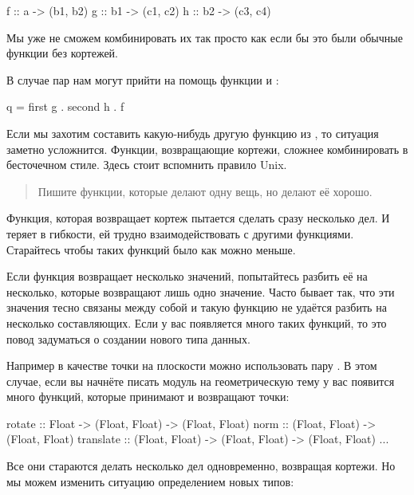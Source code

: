 \begin{code}
f :: a  -> (b1, b2)
g :: b1 -> (c1, c2)
h :: b2 -> (c3, c4)
\end{code}

Мы уже не сможем комбинировать их так просто как если бы
это были обычные функции без кортежей. 



В случае пар нам могут прийти на помощь функции 
и :

\begin{code}
q = first g . second h . f
\end{code}

Если мы захотим составить какую-нибудь другую 
функцию из , то ситуация заметно усложнится. 
Функции, возвращающие кортежи, сложнее 
комбинировать в бесточечном стиле.
Здесь стоит вспомнить правило Unix. 

\begin{quote}
Пишите функции, которые делают одну вещь, но делают её хорошо. 
\end{quote}

Функция, которая возвращает кортеж пытается
сделать сразу несколько дел. И теряет в гибкости,
ей трудно взаимодействовать с другими функциями. 
Старайтесь чтобы таких функций было как можно меньше. 

Если функция возвращает несколько значений, попытайтесь
разбить её на несколько, которые возвращают лишь одно
значение. Часто бывает так, что эти значения тесно связаны
между собой и такую функцию не удаётся разбить на 
несколько составляющих. Если у вас появляется много 
таких функций, то это повод задуматься о создании нового
типа данных. 

Например в качестве точки на плоскости можно использовать
пару . В этом случае, если вы начнёте 
писать модуль на геометрическую тему у вас появится много функций,
которые принимают и возвращают точки:

\begin{code}
rotate      :: Float -> (Float, Float) -> (Float, Float)
norm        :: (Float, Float) -> (Float, Float)
translate   :: (Float, Float) -> (Float, Float) -> (Float, Float)
...    
\end{code}

Все они стараются делать несколько дел одновременно,
возвращая кортежи. Но мы можем изменить ситуацию 
определением новых типов:


